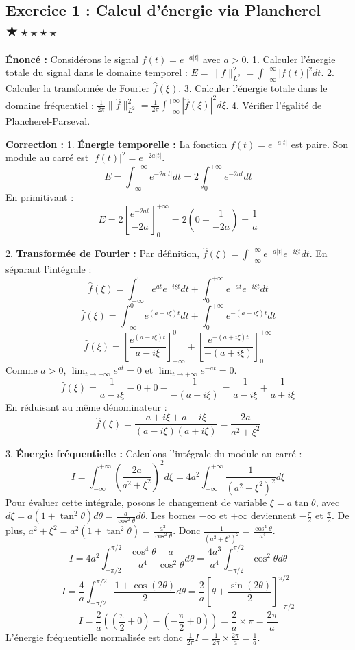 \documentclass[11pt,a4paper]{article}
\begin{document}
\subsection*{Exercice 1 : Calcul d'énergie via Plancherel \quad $\bigstar\star\star\star\star$}

\textbf{Énoncé :}
Considérons le signal $f(t) = e^{-a|t|}$ avec $a > 0$.
1. Calculer l'énergie totale du signal dans le domaine temporel : $E = \|f\|_{L^2}^2 = \int_{-\infty}^{+\infty} |f(t)|^2 dt$.
2. Calculer la transformée de Fourier $\hat{f}(\xi)$.
3. Calculer l'énergie totale dans le domaine fréquentiel : $\frac{1}{2\pi} \|\hat{f}\|_{L^2}^2 = \frac{1}{2\pi} \int_{-\infty}^{+\infty} |\hat{f}(\xi)|^2 d\xi$.
4. Vérifier l'égalité de Plancherel-Parseval.

\textbf{Correction :}
1. \textbf{Énergie temporelle :}
La fonction $f(t) = e^{-a|t|}$ est paire. Son module au carré est $|f(t)|^2 = e^{-2a|t|}$.
$$ E = \int_{-\infty}^{+\infty} e^{-2a|t|} dt = 2 \int_{0}^{+\infty} e^{-2at} dt $$
En primitivant :
$$ E = 2 \left[ \frac{e^{-2at}}{-2a} \right]_0^{+\infty} = 2 \left( 0 - \frac{1}{-2a} \right) = \frac{1}{a} $$

2. \textbf{Transformée de Fourier :}
Par définition, $\hat{f}(\xi) = \int_{-\infty}^{+\infty} e^{-a|t|} e^{-i\xi t} dt$.
En séparant l'intégrale :
$$ \hat{f}(\xi) = \int_{-\infty}^{0} e^{at} e^{-i\xi t} dt + \int_{0}^{+\infty} e^{-at} e^{-i\xi t} dt $$
$$ \hat{f}(\xi) = \int_{-\infty}^{0} e^{(a-i\xi)t} dt + \int_{0}^{+\infty} e^{-(a+i\xi)t} dt $$
$$ \hat{f}(\xi) = \left[ \frac{e^{(a-i\xi)t}}{a-i\xi} \right]_{-\infty}^0 + \left[ \frac{e^{-(a+i\xi)t}}{-(a+i\xi)} \right]_0^{+\infty} $$
Comme $a>0$, $\lim_{t \to -\infty} e^{at} = 0$ et $\lim_{t \to +\infty} e^{-at} = 0$.
$$ \hat{f}(\xi) = \frac{1}{a-i\xi} - 0 + 0 - \frac{1}{-(a+i\xi)} = \frac{1}{a-i\xi} + \frac{1}{a+i\xi} $$
En réduisant au même dénominateur :
$$ \hat{f}(\xi) = \frac{a+i\xi + a-i\xi}{(a-i\xi)(a+i\xi)} = \frac{2a}{a^2 + \xi^2} $$

3. \textbf{Énergie fréquentielle :}
Calculons l'intégrale du module au carré :
$$ I = \int_{-\infty}^{+\infty} \left( \frac{2a}{a^2 + \xi^2} \right)^2 d\xi = 4a^2 \int_{-\infty}^{+\infty} \frac{1}{(a^2 + \xi^2)^2} d\xi $$
Pour évaluer cette intégrale, posons le changement de variable $\xi = a \tan \theta$, avec $d\xi = a(1+\tan^2\theta) d\theta = \frac{a}{\cos^2\theta} d\theta$.
Les bornes $-\infty$ et $+\infty$ deviennent $-\frac{\pi}{2}$ et $\frac{\pi}{2}$.
De plus, $a^2 + \xi^2 = a^2(1+\tan^2\theta) = \frac{a^2}{\cos^2\theta}$.
Donc $\frac{1}{(a^2+\xi^2)^2} = \frac{\cos^4\theta}{a^4}$.
$$ I = 4a^2 \int_{-\pi/2}^{\pi/2} \frac{\cos^4\theta}{a^4} \frac{a}{\cos^2\theta} d\theta = \frac{4a^3}{a^4} \int_{-\pi/2}^{\pi/2} \cos^2\theta d\theta $$
$$ I = \frac{4}{a} \int_{-\pi/2}^{\pi/2} \frac{1+\cos(2\theta)}{2} d\theta = \frac{2}{a} \left[ \theta + \frac{\sin(2\theta)}{2} \right]_{-\pi/2}^{\pi/2} $$
$$ I = \frac{2}{a} \left( \left(\frac{\pi}{2} + 0\right) - \left(-\frac{\pi}{2} + 0\right) \right) = \frac{2}{a} \times \pi = \frac{2\pi}{a} $$
L'énergie fréquentielle normalisée est donc $\frac{1}{2\pi} I = \frac{1}{2\pi} \times \frac{2\pi}{a} = \frac{1}{a}$.
\end{document}
